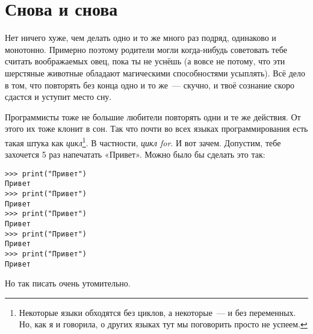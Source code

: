 %
%
%

\chapter{Снова и снова}\label{ch:againandagain}

Нет ничего хуже, чем делать одно и то же много раз подряд, одинаково и монотонно. Примерно поэтому родители могли когда-нибудь советовать тебе считать воображаемых овец, пока ты не уснёшь (а вовсе не потому, что эти шерстяные животные обладают магическими способностями усыплять). Всё дело в том, что повторять без конца одно и то же — скучно, и твоё сознание скоро сдастся и уступит место сну.

Программисты тоже не большие любители повторять одни и те же действия. От этого их тоже клонит в сон. Так что почти во всех языках программирования есть такая штука как \textit{цикл}\footnote{Некоторые языки обходятся без циклов, а некоторые — и без переменных. Но, как я и говорила, о других языках тут мы поговорить просто не успеем.}. В частности, \textit{цикл for}. И вот зачем. Допустим, тебе захочется 5 раз напечатать «Привет». Можно было бы сделать это так:
\begin{listing}
\begin{verbatim}
>>> print("Привет")
Привет
>>> print("Привет")
Привет
>>> print("Привет")
Привет
>>> print("Привет")
Привет
>>> print("Привет")
Привет
\end{verbatim}
\end{listing}

Но так писать очень утомительно.

